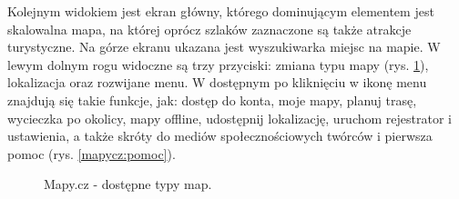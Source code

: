Kolejnym widokiem jest ekran główny, którego dominującym elementem jest skalowalna mapa, na której oprócz szlaków zaznaczone są także atrakcje turystyczne. Na górze ekranu ukazana jest wyszukiwarka miejsc na mapie. W lewym dolnym rogu widoczne są trzy przyciski: zmiana typu mapy (rys. \ref{mapycz:mapy}), lokalizacja oraz rozwijane menu.  W dostępnym po kliknięciu w ikonę menu znajdują się takie funkcje, jak: dostęp do konta, moje mapy, planuj trasę, wycieczka po okolicy, mapy offline, udostępnij lokalizację, uruchom rejestrator i ustawienia, a także skróty do mediów społecznościowych twórców i pierwsza pomoc (rys. \ref{mapycz:pomoc}).
\begin{figure}[H]
    \centering
    \caption{Mapy.cz - dostępne typy map.}
    \label{mapycz:mapy}
\end{figure}
